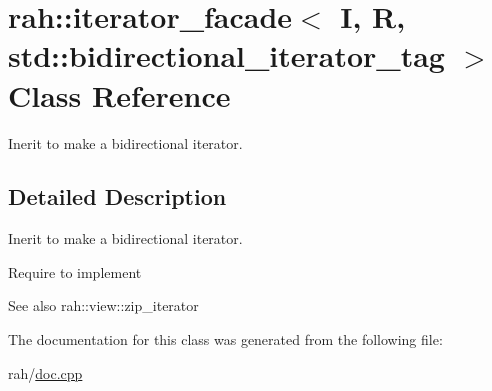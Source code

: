 \hypertarget{classrah_1_1iterator__facade_3_01_i_00_01_r_00_01std_1_1bidirectional__iterator__tag_01_4}{}\section{rah\+::iterator\+\_\+facade$<$ I, R, std\+::bidirectional\+\_\+iterator\+\_\+tag $>$ Class Reference}
\label{classrah_1_1iterator__facade_3_01_i_00_01_r_00_01std_1_1bidirectional__iterator__tag_01_4}


Inerit to make a bidirectional iterator.  




\subsection{Detailed Description}
Inerit to make a bidirectional iterator. 

Require to implement 
\begin{DoxyCode}{0}
\end{DoxyCode}
 \begin{DoxySeeAlso}{See also}
rah\+::view\+::zip\+\_\+iterator 
\end{DoxySeeAlso}


The documentation for this class was generated from the following file\+:\begin{DoxyCompactItemize}
\item 
rah/\mbox{\hyperlink{doc_8cpp}{doc.\+cpp}}\end{DoxyCompactItemize}
